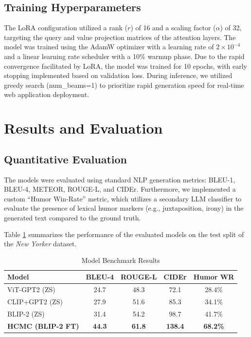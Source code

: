 \documentclass[10pt, conference, compsoc]{IEEEtran}
\begin{document}
\subsection{Training Hyperparameters}
The LoRA configuration utilized a rank ($r$) of 16 and a scaling factor ($\alpha$) of 32, targeting the query and value projection matrices of the attention layers. The model was trained using the AdamW optimizer with a learning rate of $2 \times 10^{-4}$ and a linear learning rate scheduler with a 10\% warmup phase. Due to the rapid convergence facilitated by LoRA, the model was trained for 10 epochs, with early stopping implemented based on validation loss. During inference, we utilized greedy search (num\_beams=1) to prioritize rapid generation speed for real-time web application deployment.

\section{Results and Evaluation}

\subsection{Quantitative Evaluation}
The models were evaluated using standard NLP generation metrics: BLEU-1, BLEU-4, METEOR, ROUGE-L, and CIDEr. Furthermore, we implemented a custom ``Humor Win-Rate'' metric, which utilizes a secondary LLM classifier to evaluate the presence of lexical humor markers (e.g., juxtaposition, irony) in the generated text compared to the ground truth.

Table \ref{tab:results} summarizes the performance of the evaluated models on the test split of the \textit{New Yorker} dataset.

\begin{table}[h]
\centering
\caption{Model Benchmark Results}
\label{tab:results}
\begin{tabular}{lcccc}
\toprule
\textbf{Model} & \textbf{BLEU-4} & \textbf{ROUGE-L} & \textbf{CIDEr} & \textbf{Humor WR} \\
\midrule
ViT-GPT2 (ZS) & 24.7 & 48.3 & 72.1 & 28.4\% \\
CLIP+GPT2 (ZS) & 27.9 & 51.6 & 85.3 & 34.1\% \\
BLIP-2 (ZS) & 31.4 & 54.2 & 98.7 & 41.7\% \\
\textbf{HCMC (BLIP-2 FT)} & \textbf{44.3} & \textbf{61.8} & \textbf{138.4} & \textbf{68.2\%} \\
\bottomrule
\end{tabular}
\end{table}
\end{document}
